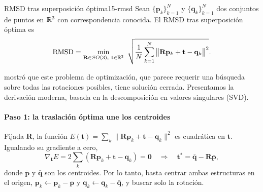\begin{definicion}{RMSD tras superposición óptima}{15-rmsd}
Sean $\{\mathbf p_k\}_{k=1}^N$ y $\{\mathbf q_k\}_{k=1}^N$ dos conjuntos de puntos en $\mathbb{R}^3$ con correspondencia conocida. El RMSD tras superposición óptima es
\begin{equation}\label{eq:15-rmsd}
\mathrm{RMSD} = \min_{\mathbf R\in SO(3),\ \mathbf t\in\R^3}\ \sqrt{\frac1N\sum_{k=1}^{N}\big\lVert \mathbf R\mathbf p_k+\mathbf t-\mathbf q_k\big\rVert^2}.
\end{equation}
\end{definicion}

\begin{simbolos}
\end{simbolos}

\textcite{c15-kabsch1976} mostró que este problema de optimización, que parece requerir una búsqueda sobre todas las rotaciones posibles, tiene solución cerrada. Presentamos la derivación moderna, basada en la descomposición en valores singulares (SVD).

\paragraph{Paso 1: la traslación óptima une los centroides} Fijada $\mathbf R$, la función $E(\mathbf t)=\sum_k\lVert\mathbf R\mathbf p_k+\mathbf t-\mathbf q_k\rVert^2$ es cuadrática en $\mathbf t$. Igualando su gradiente a cero,
\[
\nabla_{\mathbf t}E = 2\sum_k(\mathbf R\mathbf p_k+\mathbf t-\mathbf q_k)=\mathbf 0
\quad\Longrightarrow\quad
\mathbf t^\ast = \bar{\mathbf q}-\mathbf R\bar{\mathbf p},
\]
donde $\bar{\mathbf p}$ y $\bar{\mathbf q}$ son los centroides. Por lo tanto, basta centrar ambas estructuras en el origen, $\mathbf p_k\leftarrow\mathbf p_k-\bar{\mathbf p}$ y $\mathbf q_k\leftarrow\mathbf q_k-\bar{\mathbf q}$, y buscar solo la rotación.

